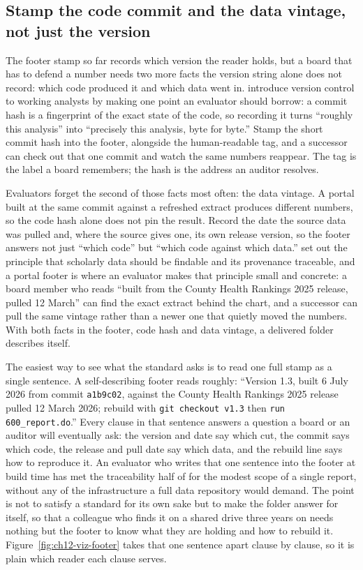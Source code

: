 \documentclass[
    a4paper,
    fontsize=10pt,
    twoside=true,
    numbers=noenddot,
]{kaobook}
\begin{document}
\subsection{Stamp the code commit and the data vintage, not just the version}
The footer stamp so far records which version the reader holds, but a board that has to defend a number needs two more facts the version string alone does not record: which code produced it and which data went in. \textcite{blischak2016git} introduce version control to working analysts by making one point an evaluator should borrow: a commit hash is a fingerprint of the exact state of the code, so recording it turns \enquote{roughly this analysis} into \enquote{precisely this analysis, byte for byte.} Stamp the short commit hash into the footer, alongside the human-readable tag, and a successor can check out that one commit and watch the same numbers reappear. The tag is the label a board remembers; the hash is the address an auditor resolves.

Evaluators forget the second of those facts most often: the data vintage. A portal built at the same commit against a refreshed extract produces different numbers, so the code hash alone does not pin the result. Record the date the source data was pulled and, where the source gives one, its own release version, so the footer answers not just \enquote{which code} but \enquote{which code against which data.} \textcite{wilkinson2016fair} set out the principle that scholarly data should be findable and its provenance traceable, and a portal footer is where an evaluator makes that principle small and concrete: a board member who reads \enquote{built from the County Health Rankings 2025 release, pulled 12 March} can find the exact extract behind the chart, and a successor can pull the same vintage rather than a newer one that quietly moved the numbers. With both facts in the footer, code hash and data vintage, a delivered folder describes itself.

The easiest way to see what the standard asks is to read one full stamp as a single sentence. A self-describing footer reads roughly: \enquote{Version 1.3, built 6 July 2026 from commit \texttt{a1b9c02}, against the County Health Rankings 2025 release pulled 12 March 2026; rebuild with \texttt{git checkout v1.3} then \texttt{run 600\_report.do}.} Every clause in that sentence answers a question a board or an auditor will eventually ask: the version and date say which cut, the commit says which code, the release and pull date say which data, and the rebuild line says how to reproduce it. An evaluator who writes that one sentence into the footer at build time has met the traceability half of \textcite{wilkinson2016fair} for the modest scope of a single report, without any of the infrastructure a full data repository would demand. The point is not to satisfy a standard for its own sake but to make the folder answer for itself, so that a colleague who finds it on a shared drive three years on needs nothing but the footer to know what they are holding and how to rebuild it. Figure~\ref{fig:ch12-viz-footer} takes that one sentence apart clause by clause, so it is plain which reader each clause serves.
\end{document}

